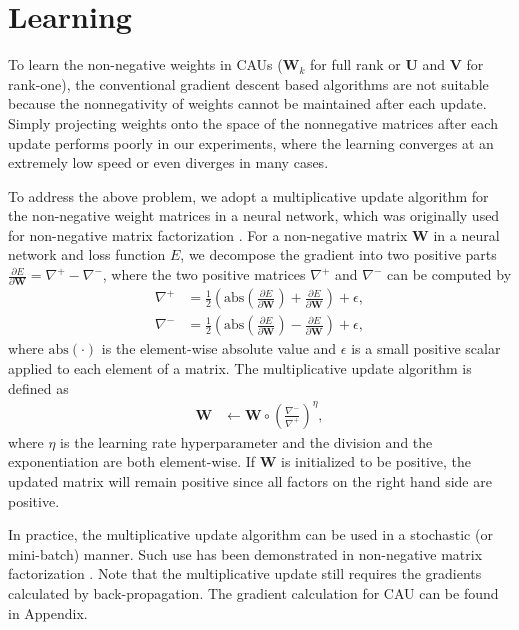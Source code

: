 \documentclass[conference]{IEEEtran}
\begin{document}
\section{Learning} \label{sec:learning}
To learn the non-negative weights in CAUs ($\mathbf{W}_k$ for full rank or $\mathbf{U}$ and $\mathbf{V}$ for rank-one), 
the conventional gradient descent based algorithms are not suitable because the nonnegativity of weights cannot be maintained after each update. Simply projecting weights onto the space of the nonnegative matrices after each update performs poorly in our experiments, where the learning converges at an extremely low speed or even diverges in many cases.

To address the above problem, we adopt a multiplicative update algorithm for the non-negative weight matrices in a neural network, which was originally used for non-negative matrix factorization \cite{lee2001algorithms}. 
%
For a non-negative matrix $\mathbf{W}$ in a neural network and loss function $E$, we decompose the gradient into two positive parts $\frac{\partial E}{\partial \mathbf{W}} = \nabla^+ - \nabla^-$,
where the two positive matrices $\nabla^+$ and $\nabla^-$ can be computed by 
\begin{align}
\nabla^+ &= \frac{1}{2}\left(\text{abs}\left(\frac{\partial E}{\partial \mathbf{W}}\right) + \frac{\partial E}{\partial \mathbf{W}}\right) + \epsilon, \\
\nabla^- &= \frac{1}{2}\left(\text{abs}\left(\frac{\partial E}{\partial \mathbf{W}}\right) - \frac{\partial E}{\partial \mathbf{W}}\right) + \epsilon,
\end{align}
where $\text{abs}(\cdot)$ is the element-wise absolute value and $\epsilon$ is a small positive scalar applied to each element of a matrix.
The multiplicative update algorithm is defined as 
\begin{align} 
\mathbf{W} &\leftarrow \mathbf{W}
 \circ 
\left(\frac{\nabla^- }{\nabla^+ }\right)^\eta,
\label{mul_update}
\end{align}
where $\eta$ is the learning rate hyperparameter and the division and the exponentiation are both element-wise. If $\mathbf{W}$ is initialized to be positive, the updated matrix will remain positive since all factors on the right hand side are positive. 

In practice, the multiplicative update algorithm can be used in a stochastic (or mini-batch) manner. Such use has been demonstrated in non-negative matrix factorization \cite{serizel2016mini}. Note that the multiplicative update still requires the gradients calculated by back-propagation. The gradient calculation for CAU can be found in Appendix.
\end{document}
